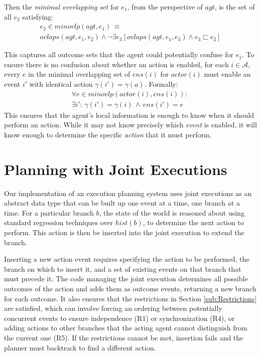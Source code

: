 Then the \emph{minimal overlapping set} for $e_{1}$, from the perspective
of $agt$, is the set of all $e_{2}$ satisfying:\begin{multline*}
e_{2}\in minovlp(agt,e_{1})\,\equiv\\
ovlaps(agt,e_{1},e_{2})\wedge\neg\exists e_{3}\left[ovlaps(agt,e_{1},e_{3})\wedge e_{3}\sqsubset e_{2}\right]\end{multline*}


This captures all outcome sets that the agent could potentially confuse
for $e_{1}$. To ensure there is no confusion about whether an action
is enabled, for each $i\in\mathcal{A}$, every $e$ in the minimal
overlapping set of $ens(i)$ for $actor(i)$ must enable an event
$i'$ with identical action $\gamma(i')=\gamma(a)$. Formally:\begin{multline*}
\forall e\in minovlp(actor(i),ens(i)):\,\\
\exists i':\,\gamma(i')=\gamma(i)\,\wedge\, ens(i')=e\end{multline*}
 This ensures that the agent's local information is enough to know
when it should perform an action. While it may not know precisely
which \emph{event} is enabled, it will know enough to determine the
specific \emph{action} that it must perform.%


\section{Planning with Joint Executions\label{sec:JointExec:Planning}}

Our implementation of an execution planning system uses joint executions
as an abstract data type that can be built up one event at a time,
one branch at a time. For a particular branch $b$, the state of the
world is reasoned about using standard regression techniques over
$hist(b)$, to determine the next action to perform. This action is
then be inserted into the joint execution to extend the branch.

Inserting a new action event requires specifying the action to be
performed, the branch on which to insert it, and a set of existing
events on that branch that must precede it. The code managing the
joint execution determines all possible outcomes of the action and
adds them as outcome events, returning a new branch for each outcome.
It also ensures that the restrictions in Section \ref{sub:Restrictions}
are satisfied, which can involve forcing an ordering between potentially
concurrent events to ensure independence (R1) or synchronization (R4),
or adding actions to other branches that the acting agent cannot distinguish
from the current one (R5). If the restrictions cannot be met, insertion
fails and the planner must backtrack to find a different action.

